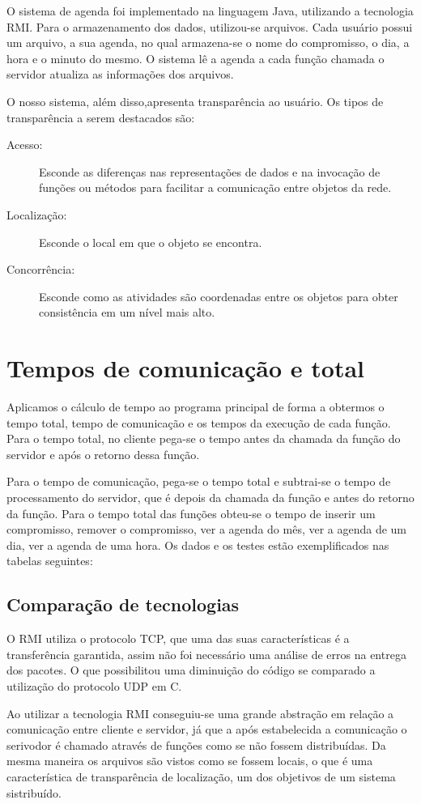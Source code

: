 \documentclass[10pt,a4paper]{article}
\begin{document}
O sistema de agenda foi implementado na linguagem Java, utilizando a tecnologia RMI. Para o armazenamento dos dados, utilizou-se arquivos. Cada
usuário possui um arquivo, a sua agenda, no qual armazena-se o nome do compromisso, o dia, a hora e o minuto do
mesmo. O sistema lê a agenda a cada função chamada o servidor atualiza as informações dos arquivos.

O nosso sistema, além disso,apresenta transparência ao usuário. Os tipos de transparência a serem destacados são:
\begin{description}
\item[Acesso:] Esconde as diferenças nas representações de dados e na invocação de funções ou métodos para facilitar a comunicação
entre objetos da rede.
\item[Localização:] Esconde o local em que o objeto se encontra.
\item[Concorrência:] Esconde como as atividades são coordenadas entre os objetos para obter consistência em um nível mais
alto.
\end{description}


\section{Tempos de comunicação e total}
Aplicamos o cálculo de tempo ao programa principal de forma a obtermos o tempo total, tempo de comunicação e
os tempos da execução de cada função. Para o tempo total, no cliente pega-se o tempo antes da chamada da função do servidor e após o
retorno dessa função.

 Para o tempo de comunicação, pega-se o tempo total e subtrai-se o tempo de processamento do servidor, que
é depois da chamada da função e antes do retorno da função.
Para o tempo total das funções obteu-se o tempo de inserir um compromisso, remover o compromisso, ver a agenda
do mês, ver a agenda de um dia, ver a agenda de uma hora. Os dados e os testes estão exemplificados nas tabelas seguintes:

  \subsection{Comparação de tecnologias}
O RMI utiliza o protocolo TCP, que uma das suas características é 
a transferência garantida, assim não foi necessário uma análise de erros na entrega
dos pacotes. O que possibilitou uma diminuição do código se comparado
 a utilização do protocolo UDP em C.

Ao utilizar a tecnologia RMI conseguiu-se uma grande abstração em relação a
 comunicação entre cliente e servidor, já que a após estabelecida a comunicação o serivodor
 é chamado através de funções como se não fossem distribuídas. Da mesma maneira os arquivos são vistos como se fossem locais,
o que é uma característica de transparência de localização, um dos objetivos de um sistema sistribuído. 
\end{document}
